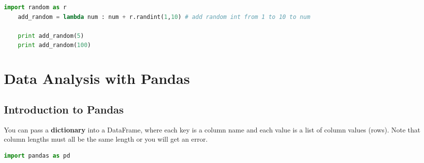\documentclass[11pt, a4paper]{article}
\begin{document}
\begin{spacing}{1.1}
\begin{lstlisting}[language=Python]
	import random as r
	add_random = lambda num : num + r.randint(1,10) # add random int from 1 to 10 to num
	
	print add_random(5)
	print add_random(100) \end{lstlisting}\vspace*{5mm}
	
	\section{Data Analysis with Pandas}
	\subsection{Introduction to Pandas}
	You can pass a \textbf{dictionary} into a DataFrame, where each key is a column name and each value is a list of column values (rows). Note that column lengths must all be the same length or you will get an error.
	\begin{lstlisting}[language=Python]
	import pandas as pd
	

\end{lstlisting}
\end{spacing}
\end{document}
